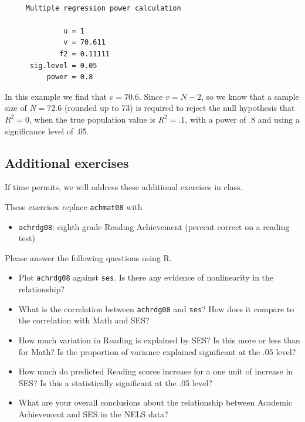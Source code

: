 \documentclass[
  letterpaper,
  DIV=11,
  numbers=noendperiod]{scrreprt}
\providecommand{\tightlist}{%
  \setlength{\itemsep}{0pt}\setlength{\parskip}{0pt}}\usepackage{longtable,booktabs,array}
\begin{document}
\begin{verbatim}

     Multiple regression power calculation 

              u = 1
              v = 70.611
             f2 = 0.11111
      sig.level = 0.05
          power = 0.8
\end{verbatim}

In this example we find that \(v = 70.6\). Since \(v = N - 2\), so we
know that a sample size of \(N = 72.6\) (rounded up to 73) is required
to reject the null hypothesis that \(R^2 = 0\), when the true population
value is \(R^2 = .1\), with a power of .8 and using a significance level
of .05.

\hypertarget{additional-exercises}{%
\subsection{Additional exercises}\label{additional-exercises}}

If time permits, we will address these additional exercises in class.

These exercises replace \texttt{achmat08} with

\begin{itemize}
\tightlist
\item
  \texttt{achrdg08}: eighth grade Reading Achievement (percent correct
  on a reading test)
\end{itemize}

Please answer the following questions using R.

\begin{itemize}
\item
  Plot \texttt{achrdg08} against \texttt{ses}. Is there any evidence of
  nonlinearity in the relationship?
\item
  What is the correlation between \texttt{achrdg08} and \texttt{ses}?
  How does it compare to the correlation with Math and SES?
\item
  How much variation in Reading is explained by SES? Is this more or
  less than for Math? Is the proportion of variance explained
  significant at the .05 level?
\item
  How much do predicted Reading scores increase for a one unit of
  increase in SES? Is this a statistically significant at the .05 level?
\item
  What are your overall conclusions about the relationship between
  Academic Achievement and SES in the NELS data?
\end{itemize}
\end{document}
